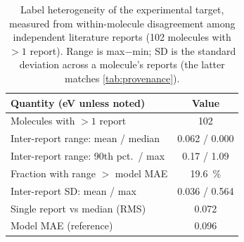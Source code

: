 \documentclass[final,3p,times,twocolumn]{elsarticle}
\begin{document}
\begin{table}[htbp]
  \centering
  \caption{Label heterogeneity of the experimental target, measured from
    within-molecule disagreement among independent literature reports
    (\num{102} molecules with $>1$ report). Range is max$-$min; SD is the standard
    deviation across a molecule's reports (the latter matches \cref{tab:provenance}).}
  \label{tab:solvent}
  \begin{tabular}{lc}
    \toprule
    Quantity (eV unless noted) & Value \\
    \midrule
    Molecules with $>1$ report                 & 102 \\
    Inter-report range: mean / median          & 0.062 / 0.000 \\
    Inter-report range: 90th pct.\ / max       & 0.17 / 1.09 \\
    Fraction with range $>$ model MAE          & \qty{19.6}{\percent} \\
    Inter-report SD: mean / max                & 0.036 / 0.564 \\
    Single report vs median (RMS)              & 0.072 \\
    \midrule
    Model MAE (reference)                      & 0.096 \\
    \bottomrule
  \end{tabular}
\end{table}
\end{document}
